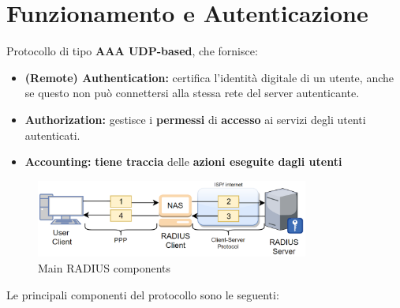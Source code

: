 \section{Funzionamento e Autenticazione}
\begin{definition}
Protocollo di tipo \textbf{AAA UDP-based}\footnotemark, che fornisce: 
\begin{itemize}
    \item \textbf{(Remote) Authentication:} certifica l'identità digitale di un utente, anche se questo non può connettersi alla stessa rete del server autenticante.
    \item \textbf{Authorization:} gestisce i \textbf{permessi} di \textbf{accesso} ai servizi degli utenti autenticati.\footnotemark
    \item \textbf{Accounting:} \textbf{tiene traccia} delle \textbf{azioni eseguite dagli utenti}\footnotemark
\end{itemize}
\end{definition}
\begin{figure}[h]
    \centering
    \includegraphics[width=0.8\textwidth]{image/radius.png}
    \caption{Main RADIUS components}
    \label{fig:radiusscheme}
\end{figure}
Le principali componenti del protocollo sono le seguenti:
